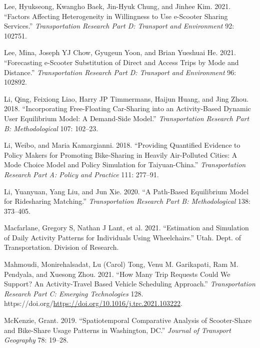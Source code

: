 \documentclass[12pt, oneside, openright]{byuthesis}
\newlength{\cslhangindent}
\newlength{\cslentryspacingunit} %
\newenvironment{CSLReferences}[2] %
 {%
  \setlength{\parindent}{0pt}
  \ifodd #1
  \let\oldpar\par
  \def\par{\hangindent=\cslhangindent\oldpar}
  \fi
  \setlength{\parskip}{#2\cslentryspacingunit}
 }%
 {}
\begin{document}
\begin{CSLReferences}{1}{0}
\leavevmode{}%
Lee, Hyukseong, Kwangho Baek, Jin-Hyuk Chung, and Jinhee Kim. 2021. {``Factors Affecting Heterogeneity in Willingness to Use e-Scooter Sharing Services.''} \emph{Transportation Research Part D: Transport and Environment} 92: 102751.

\leavevmode{}%
Lee, Mina, Joseph YJ Chow, Gyugeun Yoon, and Brian Yueshuai He. 2021. {``Forecasting e-Scooter Substitution of Direct and Access Trips by Mode and Distance.''} \emph{Transportation Research Part D: Transport and Environment} 96: 102892.

\leavevmode{}%
Li, Qing, Feixiong Liao, Harry JP Timmermans, Haijun Huang, and Jing Zhou. 2018. {``Incorporating Free-Floating Car-Sharing into an Activity-Based Dynamic User Equilibrium Model: A Demand-Side Model.''} \emph{Transportation Research Part B: Methodological} 107: 102--23.

\leavevmode{}%
Li, Weibo, and Maria Kamargianni. 2018. {``Providing Quantified Evidence to Policy Makers for Promoting Bike-Sharing in Heavily Air-Polluted Cities: A Mode Choice Model and Policy Simulation for Taiyuan-China.''} \emph{Transportation Research Part A: Policy and Practice} 111: 277--91.

\leavevmode{}%
Li, Yuanyuan, Yang Liu, and Jun Xie. 2020. {``A Path-Based Equilibrium Model for Ridesharing Matching.''} \emph{Transportation Research Part B: Methodological} 138: 373--405.

\leavevmode{}%
Macfarlane, Gregory S, Nathan J Lant, et al. 2021. {``Estimation and Simulation of Daily Activity Patterns for Individuals Using Wheelchairs.''} Utah. Dept. of Transportation. Division of Research.

\leavevmode{}%
Mahmoudi, Monirehalsadat, Lu (Carol) Tong, Venu M. Garikapati, Ram M. Pendyala, and Xuesong Zhou. 2021. {``How Many Trip Requests Could We Support? An Activity-Travel Based Vehicle Scheduling Approach.''} \emph{Transportation Research Part C: Emerging Technologies} 128. https://doi.org/\url{https://doi.org/10.1016/j.trc.2021.103222}.

\leavevmode{}%
McKenzie, Grant. 2019. {``Spatiotemporal Comparative Analysis of Scooter-Share and Bike-Share Usage Patterns in Washington, DC.''} \emph{Journal of Transport Geography} 78: 19--28.


\end{CSLReferences}
\end{document}
